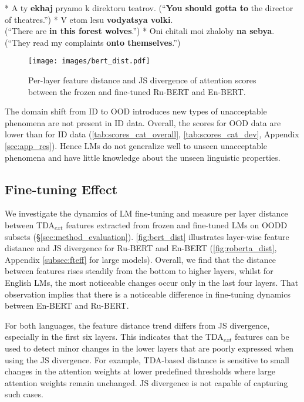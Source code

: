 \documentclass[11pt]{article}
\begin{document}
\begin{exe}
\ex \begin{xlist}
    \ex\label{ex:rucola_morph} * A ty \textbf{ekhaj} pryamo k direktoru teatrov.
(``\textbf{You should gotta to} the director of theatres.'')
\ex\label{ex:rucola_synt} * V etom lesu \textbf{vodyatsya volki}. \\
    (``There are \textbf{in this forest wolves}.'')
\ex\label{ex:rucola_sem} * Oni chitali moi zhaloby \textbf{na sebya}. (``They read my complaints \textbf{onto themselves}.'')
\end{xlist}
\end{exe}

\begin{figure*}[t!]
    \centering
    \texttt{[image: images/bert\_dist.pdf]}
    \caption{Per-layer feature distance and JS divergence of attention scores between the frozen and fine-tuned Ru-BERT and En-BERT.}
    \label{fig:bert_dist}
\end{figure*}
The domain shift from ID to OOD introduces new types of unacceptable phenomena are not present in ID data. Overall, the scores for OOD data are lower than for ID data  (\autoref{tab:scores_cat_overall}, \autoref{tab:scores_cat_dev}, Appendix \ref{sec:app_res}). Hence  LMs do not generalize well to unseen unacceptable phenomena and have little knowledge about the unseen linguistic properties.




\subsection{Fine-tuning Effect}

We investigate the dynamics of LM fine-tuning and measure per layer distance between TDA$_{ext}$ features extracted from frozen and fine-tuned LMs on OODD subsets (\S\ref{sec:method_evaluation}). 
\autoref{fig:bert_dist} illustrates layer-wise feature distance and JS divergence for Ru-BERT and En-BERT (\autoref{fig:roberta_dist}, Appendix \ref{subsec:fteff} for large models).
Overall, we find that the distance between features rises steadily from the bottom to higher layers, whilst for English LMs, the most noticeable changes occur only in the last four layers. 
That observation implies that there is a noticeable difference in fine-tuning dynamics between En-BERT and Ru-BERT. 


For both languages, the feature distance trend differs from JS divergence, especially in the first six layers. 
This indicates that the TDA$_{ext}$ features can be used to detect minor changes in the lower layers that are poorly expressed when using the JS divergence.
For example, TDA-based distance is sensitive to small changes in the attention weights at lower predefined thresholds where large attention weights remain unchanged. JS divergence is not capable of capturing such cases. 
\end{document}
